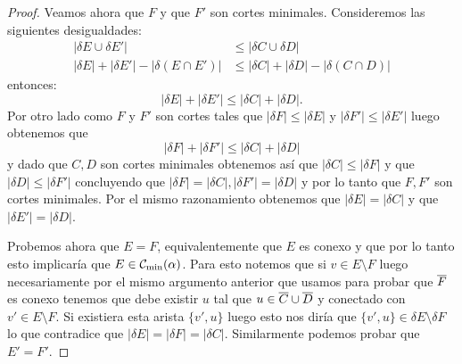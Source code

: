 \documentclass[tesis.tex]{subfiles}
\begin{document}
\begin{proof}
	
	Veamos ahora que $F$ y que $F'$ son cortes minimales.
	Consideremos las siguientes desigualdades:
	\begin{align*}
		|\delta E \cup \delta E'| & \le |\delta C \cup \delta D| \\
		|\delta E| + |\delta E'| - |\delta (E \cap E')| & \le |\delta C| + |\delta D| - |\delta (C \cap D)|
	\end{align*}
	entonces:
	\[
		|\delta E| + |\delta E'| \le |\delta C| + |\delta D|.
	\]	
	Por otro lado como $F$ y $F'$ son cortes tales que $|\delta F| \le |\delta E|$ y $|\delta F'| \le |\delta E'|$ luego obtenemos que
	\[
		|\delta F| + |\delta F'| \le |\delta C| + |\delta D|
	\] 
	y dado que $C,D$ son cortes minimales obtenemos así que $|\delta C| \le |\delta F|$ y que $|\delta D| \le |\delta F'|$ concluyendo que $|\delta F | = |\delta C|, |\delta F'| = |\delta D|$ y por lo tanto que $F,F'$ son cortes minimales.
	Por el mismo razonamiento obtenemos que $|\delta E| = |\delta C|$ y que $|\delta E'| = |\delta D|$.
	
	Probemos ahora que $E=F$, equivalentemente que $E$ es conexo y que por lo tanto esto implicaría que $E \in {\cal C}_{\text{min}}(\alpha)$.
	Para esto notemos que si $v \in E \setminus F$ luego necesariamente por el mismo argumento anterior que usamos para probar que $\overline F$ es conexo tenemos que debe existir $u$ tal que $u \in \overline C \cup \overline D$ y conectado con $v' \in E \setminus F$.
	Si existiera esta arista $\{v',u \}$ luego esto nos diría que $\{v',u \} \in \delta E \setminus \delta F$ lo que contradice que $|\delta E| = |\delta F| = |\delta C|$.
	Similarmente podemos probar que $E' = F'$.
	

\end{proof}
\end{document}
